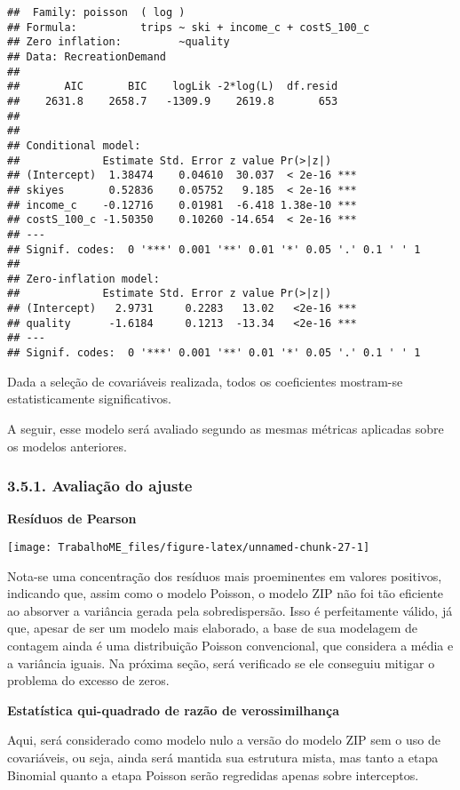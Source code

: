 \documentclass[
]{article}
\begin{document}
\begin{verbatim}
##  Family: poisson  ( log )
## Formula:          trips ~ ski + income_c + costS_100_c
## Zero inflation:         ~quality
## Data: RecreationDemand
## 
##       AIC       BIC    logLik -2*log(L)  df.resid 
##    2631.8    2658.7   -1309.9    2619.8       653 
## 
## 
## Conditional model:
##             Estimate Std. Error z value Pr(>|z|)    
## (Intercept)  1.38474    0.04610  30.037  < 2e-16 ***
## skiyes       0.52836    0.05752   9.185  < 2e-16 ***
## income_c    -0.12716    0.01981  -6.418 1.38e-10 ***
## costS_100_c -1.50350    0.10260 -14.654  < 2e-16 ***
## ---
## Signif. codes:  0 '***' 0.001 '**' 0.01 '*' 0.05 '.' 0.1 ' ' 1
## 
## Zero-inflation model:
##             Estimate Std. Error z value Pr(>|z|)    
## (Intercept)   2.9731     0.2283   13.02   <2e-16 ***
## quality      -1.6184     0.1213  -13.34   <2e-16 ***
## ---
## Signif. codes:  0 '***' 0.001 '**' 0.01 '*' 0.05 '.' 0.1 ' ' 1
\end{verbatim}

Dada a seleção de covariáveis realizada, todos os coeficientes
mostram-se estatisticamente significativos.

A seguir, esse modelo será avaliado segundo as mesmas métricas aplicadas
sobre os modelos anteriores.

\subsubsection{3.5.1. Avaliação do
ajuste}\label{avaliauxe7uxe3o-do-ajuste}

\textbf{Resíduos de Pearson}

\begin{center}\texttt{[image: TrabalhoME\_files/figure-latex/unnamed-chunk-27-1]} \end{center}

Nota-se uma concentração dos resíduos mais proeminentes em valores
positivos, indicando que, assim como o modelo Poisson, o modelo ZIP não
foi tão eficiente ao absorver a variância gerada pela sobredispersão.
Isso é perfeitamente válido, já que, apesar de ser um modelo mais
elaborado, a base de sua modelagem de contagem ainda é uma distribuição
Poisson convencional, que considera a média e a variância iguais. Na
próxima seção, será verificado se ele conseguiu mitigar o problema do
excesso de zeros.

\textbf{Estatística qui-quadrado de razão de verossimilhança}

Aqui, será considerado como modelo nulo a versão do modelo ZIP sem o uso
de covariáveis, ou seja, ainda será mantida sua estrutura mista, mas
tanto a etapa Binomial quanto a etapa Poisson serão regredidas apenas
sobre interceptos.
\end{document}
